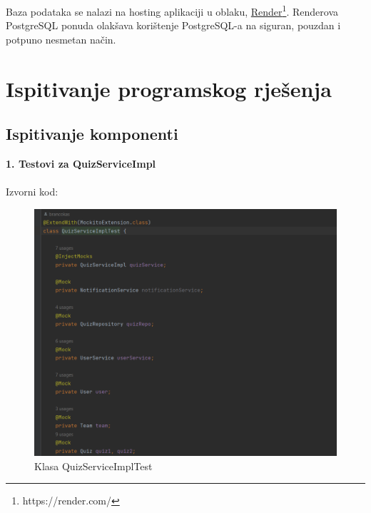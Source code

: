 			 Baza podataka se nalazi na hosting aplikaciji u oblaku, \underline{Render}\footnote{https://render.com/}. Renderova PostgreSQL ponuda olakšava korištenje PostgreSQL-a na siguran, pouzdan i potpuno nesmetan način.\\
			 			
			\eject 
		
	
		\section{Ispitivanje programskog rješenja}
			
			
	
			
			\subsection{Ispitivanje komponenti} 
			
			
			\textbf{1. Testovi za QuizServiceImpl} \\ \\
			Izvorni kod:
				
				\begin{figure}[H]
					\includegraphics[width=\textwidth]{slike/QuizServiceImplTest1.PNG} 
					\caption{Klasa QuizServiceImplTest}
					\label{fig:QuizServiceImplTest1}
				\end{figure}
			
